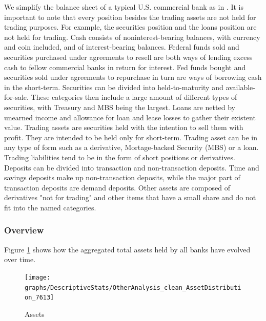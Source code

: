 \documentclass[12pt, a4paper]{article} %
\begin{document}
We simplify the balance sheet of a typical U.S. commercial bank as in \citet{begenau2015banks}.
It is important to note that every position besides the trading assets are not held for trading purposes. For example, the securities position and the loans position are not held for trading.
Cash consists of noninterest-bearing balances, with currency and coin included, and of interest-bearing balances.
Federal funds sold and securities purchased under agreements to resell are both ways of lending excess cash to fellow commercial banks in return for interest. Fed funds bought and securities sold under agreements to repurchase in turn are ways of borrowing cash in the short-term. Securities can be divided into held-to-maturity and available-for-sale. These categories then include a large amount of different types of securities, with Treasury and MBS being the largest. Loans are netted by unearned income and allowance for loan and lease losses to gather their existent value. Trading assets are securities held with the intention to sell them with profit. They are intended to be held only for short-term. Trading asset can be in any type of form such as a derivative, Mortage-backed Security (MBS) or a loan. Trading liabilities tend to be in the form of short positions or derivatives. Deposits can be divided into transaction and non-transaction deposits. Time and savings deposits make up non-transaction deposits, while the major part of transaction deposits are demand deposits. Other assets are composed of derivatives "not for trading" and other items that have a small share and do not fit into the named categories.
 
\subsubsection{Overview}
Figure \ref{fig:assets} shows how the aggregated total assets held by all banks have evolved over time. 
 
\begin{figure}[H]
\begin{minipage}{\textwidth}
\texttt{[image: graphs/DescriptiveStats/OtherAnalysis\_clean\_AssetDistribution\_7613]}
\caption[1]{Assets}
\label{fig:assets}
\end{minipage}
\end{figure} 
 
\end{document}
